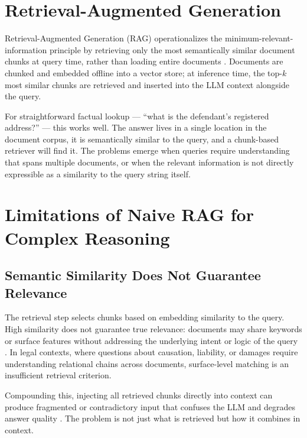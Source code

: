 \section{Retrieval-Augmented Generation}

Retrieval-Augmented Generation (RAG) operationalizes the minimum-relevant-information
principle by retrieving only the most semantically similar document chunks at query time,
rather than loading entire documents \cite{lewis2021retrievalaugmentedgenerationknowledgeintensivenlp}.
Documents are chunked and embedded offline into a vector store; at inference time, the
top-$k$ most similar chunks are retrieved and inserted into the LLM context alongside
the query.

For straightforward factual lookup --- ``what is the defendant's registered address?''
--- this works well. The answer lives in a single location in the document corpus, it
is semantically similar to the query, and a chunk-based retriever will find it. The
problems emerge when queries require understanding that spans multiple documents, or
when the relevant information is not directly expressible as a similarity to the query
string itself.

\section{Limitations of Naive RAG for Complex Reasoning}
\label{sec:rag-limitations}

\subsection{Semantic Similarity Does Not Guarantee Relevance}

The retrieval step selects chunks based on embedding similarity to the query. High
similarity does not guarantee true relevance: documents may share keywords or surface
features without addressing the underlying intent or logic of the query
\cite{gao2025synergizingragreasoningsystematic}. In legal contexts, where questions
about causation, liability, or damages require understanding relational chains across
documents, surface-level matching is an insufficient retrieval criterion.

Compounding this, injecting all retrieved chunks directly into context can produce
fragmented or contradictory input that confuses the LLM and degrades answer quality
\cite{gao2025synergizingragreasoningsystematic}. The problem is not just what is
retrieved but how it combines in context.

